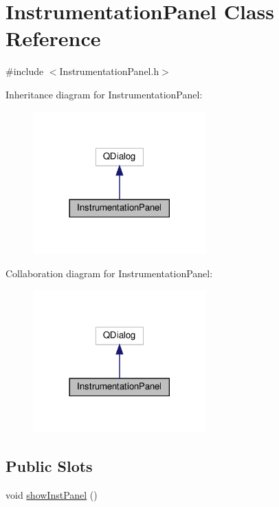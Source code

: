 \hypertarget{class_instrumentation_panel}{}\section{Instrumentation\+Panel Class Reference}
\label{class_instrumentation_panel}


{\ttfamily \#include $<$Instrumentation\+Panel.\+h$>$}



Inheritance diagram for Instrumentation\+Panel\+:
\nopagebreak
\begin{figure}[H]
\begin{center}
\leavevmode
\includegraphics[width=189pt]{class_instrumentation_panel__inherit__graph}
\end{center}
\end{figure}


Collaboration diagram for Instrumentation\+Panel\+:
\nopagebreak
\begin{figure}[H]
\begin{center}
\leavevmode
\includegraphics[width=189pt]{class_instrumentation_panel__coll__graph}
\end{center}
\end{figure}
\subsection*{Public Slots}
\begin{DoxyCompactItemize}
\item 
void \hyperlink{class_instrumentation_panel_af4f34c31b21bbf3363cf3e2c915e28bf}{show\+Inst\+Panel} ()
\end{DoxyCompactItemize}
